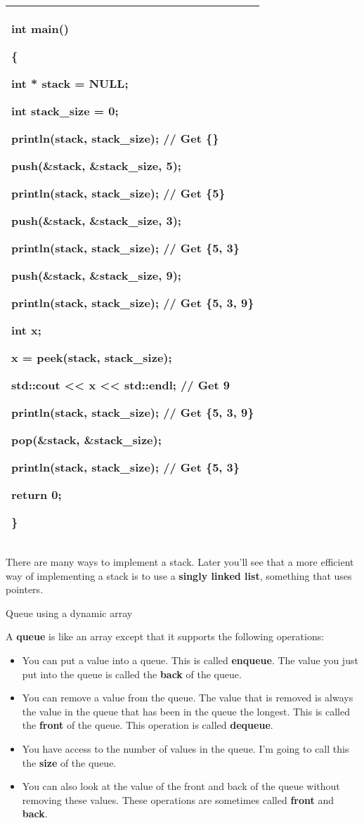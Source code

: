 \documentclass[
]{article}
\providecommand{\tightlist}{%
  \setlength{\itemsep}{0pt}\setlength{\parskip}{0pt}}
\begin{document}
\begin{longtable}[]{@{}l@{}}
\toprule
\endhead
\begin{minipage}[t]{0.97\columnwidth}\raggedright
int main()

\{

int * stack = NULL;

int stack\_size = 0;

println(stack, stack\_size); // Get \{\}

push(\&stack, \&stack\_size, 5);

println(stack, stack\_size); // Get \{5\}

push(\&stack, \&stack\_size, 3);

println(stack, stack\_size); // Get \{5, 3\}

push(\&stack, \&stack\_size, 9);

println(stack, stack\_size); // Get \{5, 3, 9\}

int x;

x = peek(stack, stack\_size);

std::cout \textless\textless{} x \textless\textless{} std::endl; // Get
9

println(stack, stack\_size); // Get \{5, 3, 9\}

pop(\&stack, \&stack\_size);

println(stack, stack\_size); // Get \{5, 3\}

return 0;

\}\strut
\end{minipage}\tabularnewline
\bottomrule
\end{longtable}

There are many ways to implement a stack. Later you'll see that a more
efficient way of implementing a stack is to use a \textbf{singly linked
list}, something that uses pointers.

Queue using a dynamic array

A \textbf{queue} is like an array except that it supports the following
operations:

\begin{itemize}
\tightlist
\item
  You can put a value into a queue. This is called \textbf{enqueue}. The
  value you just put into the queue is called the \textbf{back} of the
  queue.
\item
  You can remove a value from the queue. The value that is removed is
  always the value in the queue that has been in the queue the longest.
  This is called the \textbf{front} of the queue. This operation is
  called \textbf{dequeue}.
\item
  You have access to the number of values in the queue. I'm going to
  call this the \textbf{size} of the queue.
\item
  You can also look at the value of the front and back of the queue
  without removing these values. These operations are sometimes called
  \textbf{front} and \textbf{back}.
\end{itemize}
\end{document}
